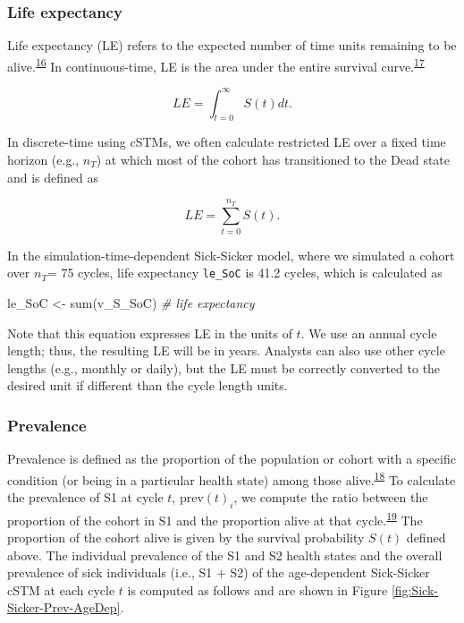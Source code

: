 \documentclass[
]{article}
\newenvironment{Shaded}{\begin{snugshade}}{\end{snugshade}}
\newcommand{\CommentTok}[1]{\textcolor[rgb]{0.56,0.35,0.01}{\textit{#1}}}
\newcommand{\FunctionTok}[1]{\textcolor[rgb]{0.00,0.00,0.00}{#1}}
\newcommand{\NormalTok}[1]{#1}
\newcommand{\OtherTok}[1]{\textcolor[rgb]{0.56,0.35,0.01}{#1}}
\begin{document}
\hypertarget{life-expectancy}{%
\subsubsection{Life expectancy}\label{life-expectancy}}

Life expectancy (LE) refers to the expected number of time units remaining to be alive.\textsuperscript{\protect\hyperlink{ref-Lee2003a}{16}} In continuous-time, LE is the area under the entire survival curve.\textsuperscript{\protect\hyperlink{ref-Klein2003}{17}}

\[
LE = \int_{t=0}^{\infty}{S(t) dt}.
\]

In discrete-time using cSTMs, we often calculate restricted LE over a fixed time horizon (e.g., \(n_T\)) at which most of the cohort has transitioned to the Dead state and is defined as

\[
  LE = \sum_{t=0}^{n_T}{S(t)}.
\]

In the simulation-time-dependent Sick-Sicker model, where we simulated a cohort over \(n_T\)= 75 cycles, life expectancy \texttt{le\_SoC} is 41.2 cycles, which is calculated as

\begin{Shaded}
\begin{Highlighting}[]
\NormalTok{le\_SoC }\OtherTok{\textless{}{-}} \FunctionTok{sum}\NormalTok{(v\_S\_SoC) }\CommentTok{\# life expectancy}
\end{Highlighting}
\end{Shaded}

Note that this equation expresses LE in the units of \(t\). We use an annual cycle length; thus, the resulting LE will be in years. Analysts can also use other cycle lengths (e.g., monthly or daily), but the LE must be correctly converted to the desired unit if different than the cycle length units.

\hypertarget{prevalence}{%
\subsubsection{Prevalence}\label{prevalence}}

Prevalence is defined as the proportion of the population or cohort with a specific condition (or being in a particular health state) among those alive.\textsuperscript{\protect\hyperlink{ref-Rothman2008h}{18}} To calculate the prevalence of S1 at cycle \(t\), \(\text{prev}(t)_i\), we compute the ratio between the proportion of the cohort in S1 and the proportion alive at that cycle.\textsuperscript{\protect\hyperlink{ref-Keiding1991}{19}} The proportion of the cohort alive is given by the survival probability \(S(t)\) defined above. The individual prevalence of the S1 and S2 health states and the overall prevalence of sick individuals (i.e., S1 + S2) of the age-dependent Sick-Sicker cSTM at each cycle \(t\) is computed as follows and are shown in Figure \ref{fig:Sick-Sicker-Prev-AgeDep}.
\end{document}
